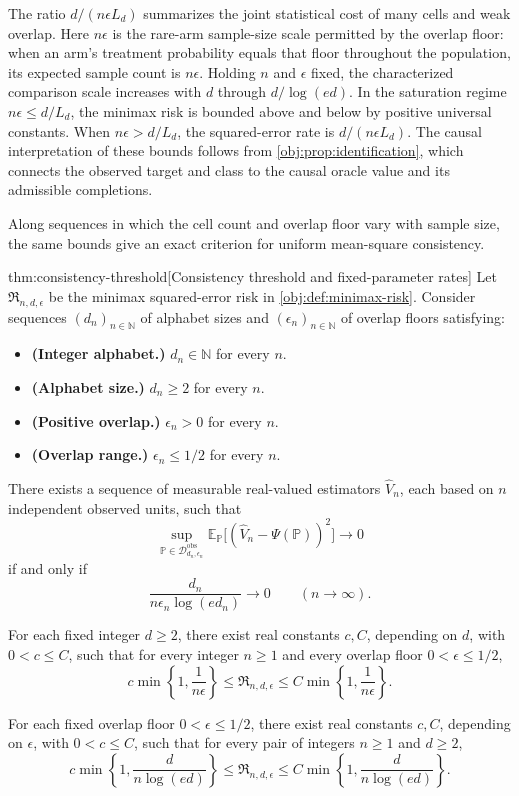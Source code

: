 \documentclass[11pt]{article}
\begin{document}
The ratio \(d/(n\epsilon L_d)\) summarizes the joint statistical cost of many cells and weak overlap. Here \(n\epsilon\) is the rare-arm sample-size scale permitted by the overlap floor: when an arm's treatment probability equals that floor throughout the population, its expected sample count is \(n\epsilon\). Holding \(n\) and \(\epsilon\) fixed, the characterized comparison scale increases with \(d\) through \(d/\log(ed)\). In the saturation regime \(n\epsilon\le d/L_d\), the minimax risk is bounded above and below by positive universal constants. When \(n\epsilon>d/L_d\), the squared-error rate is \(d/(n\epsilon L_d)\). The causal interpretation of these bounds follows from \cref{obj:prop:identification}, which connects the observed target and class to the causal oracle value and its admissible completions.

Along sequences in which the cell count and overlap floor vary with sample size, the same bounds give an exact criterion for uniform mean-square consistency.

\begin{theoremv}{thm:consistency-threshold}[Consistency threshold and fixed-parameter rates]
Let \(\mathfrak R_{n,d,\epsilon}\) be the minimax squared-error risk in \cref{obj:def:minimax-risk}. Consider sequences \((d_n)_{n\in\mathbb N}\) of alphabet sizes and \((\epsilon_n)_{n\in\mathbb N}\) of overlap floors satisfying:
\begin{itemize}
\item \textbf{(Integer alphabet.)} \(d_n\in\mathbb N\) for every \(n\).
\item \textbf{(Alphabet size.)} \(d_n\ge2\) for every \(n\).
\item \textbf{(Positive overlap.)} \(\epsilon_n>0\) for every \(n\).
\item \textbf{(Overlap range.)} \(\epsilon_n\le1/2\) for every \(n\).
\end{itemize}
There exists a sequence of measurable real-valued estimators \(\widehat V_n\), each based on \(n\) independent observed units, such that
\[
\sup_{\mathbb P\in\mathcal D_{d_n,\epsilon_n}^{\mathrm{obs}}}
\mathbb E_{\mathbb P}
\bigl[(\widehat V_n-\Psi(\mathbb P))^2\bigr]
\longrightarrow0
\]
if and only if
\[
\frac{d_n}{n\epsilon_n\log(e d_n)}
\longrightarrow0
\qquad (n\to\infty).
\]

For each fixed integer \(d\ge2\), there exist real constants \(c,C\), depending on \(d\), with \(0<c\le C\), such that for every integer \(n\ge1\) and every overlap floor \(0<\epsilon\le1/2\),
\[
c\min\left\{1,\frac{1}{n\epsilon}\right\}
\le \mathfrak R_{n,d,\epsilon}
\le C\min\left\{1,\frac{1}{n\epsilon}\right\}.
\]

For each fixed overlap floor \(0<\epsilon\le1/2\), there exist real constants \(c,C\), depending on \(\epsilon\), with \(0<c\le C\), such that for every pair of integers \(n\ge1\) and \(d\ge2\),
\[
c\min\left\{1,\frac{d}{n\log(e d)}\right\}
\le \mathfrak R_{n,d,\epsilon}
\le C\min\left\{1,\frac{d}{n\log(e d)}\right\}.
\]
\end{theoremv}
\end{document}
